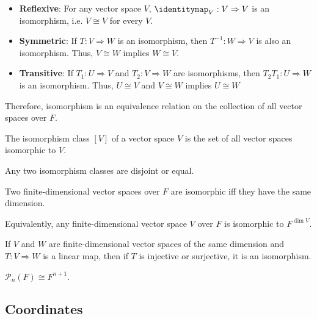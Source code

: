 \begin{theorem}
  \begin{itemize}
    \item \textbf{Reflexive}: For any vector space $V$, $\identitymap_V : V \Rightarrow V$ is an isomorphism, i.e. $V \cong V$ for every $V$.
    \item \textbf{Symmetric}: If $T : V \Rightarrow W$ is an isomorphism, then $T^{-1} : W \Rightarrow V$ is also an isomorphism. Thus, $V \cong W$ implies $W \cong V$.
    \item \textbf{Transitive}: If $T_1 : U \Rightarrow V$ and $T_2 : V \Rightarrow W$ are isomorphisms, then $T_2 T_1 : U \Rightarrow W$ is an isomorphism. Thus, $U \cong V$ and $V \cong W$ implies $U \cong W$
  \end{itemize}
  Therefore, isomorphism is an equivalence relation on the collection of all vector spaces over $F$.
\end{theorem}

\begin{definition}
  The isomorphism class $[V]$ of a vector space $V$ is the set of all vector spaces isomorphic to $V$.
\end{definition}

\begin{lemma}
  Any two isomorphism classes are disjoint or equal.
\end{lemma}

\begin{theorem}
  Two finite-dimensional vector spaces over $F$ are isomorphic iff they have the same dimension.

  Equivalently, any finite-dimensional vector space $V$ over $F$ is isomorphic to $F^{\dim V}$.
\end{theorem}

\begin{theorem}
  If $V$ and $W$ are finite-dimensional vector spaces of the same dimension and $T : V \Rightarrow W$ is a linear map, then if $T$ is injective or surjective, it is an isomorphism.
\end{theorem}

\begin{lemma}
  $\mathcal{P}_n(F) \cong F^{n+1}$.
\end{lemma}

\subsection{Coordinates}

